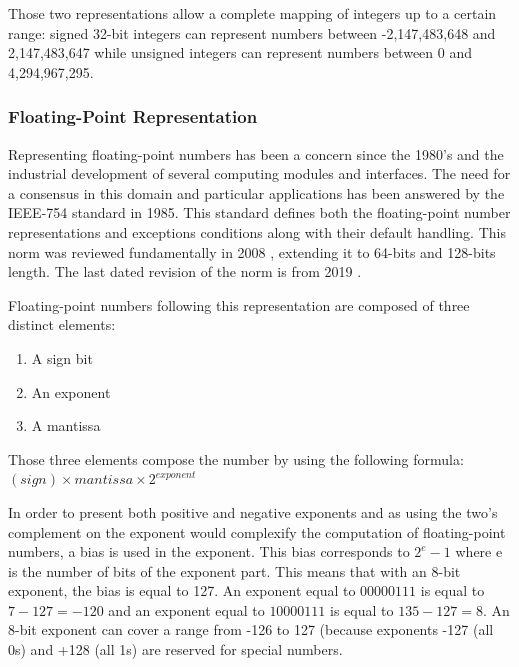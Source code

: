
Those two representations allow a complete mapping of integers up to a certain range: signed 32-bit integers can represent numbers between -2,147,483,648 and 2,147,483,647 while unsigned integers can represent numbers between 0 and 4,294,967,295.

\subsubsection{Floating-Point Representation}

Representing floating-point numbers has been a concern since the 1980's and the industrial development of several computing modules and interfaces. The need for a consensus in this domain and particular applications has been answered by the IEEE-754 standard \cite{Ieee754_1985} in 1985. This standard defines both the floating-point number representations and exceptions conditions along with their default handling. This norm was reviewed fundamentally in 2008 \cite{Ieee754_2008}, extending it to 64-bits and 128-bits length. The last dated revision of the norm is from 2019 \cite{Ieee754_2019}.

Floating-point numbers following this representation are composed of three distinct elements:
\begin{enumerate}
  \item A sign bit
  \item An exponent
  \item A mantissa
\end{enumerate}

Those three elements compose the number by using the following formula: $(\mathit{sign}) \times \mathit{mantissa} \times 2^{\mathit{exponent}}$

In order to present both positive and negative exponents and as using the two's complement on the exponent would complexify the computation of floating-point numbers, a bias is used in the exponent. This bias corresponds to $2^e - 1$ where e is the number of bits of the exponent part. This means that with an 8-bit exponent, the bias is equal to 127. An exponent equal to $00000111$ is equal to $7 - 127 = -120$ and an exponent equal to $10000111$ is equal to $135 - 127 = 8$. An 8-bit exponent can cover a range from -126 to 127 (because exponents -127 (all 0s) and +128 (all 1s) are reserved for special numbers.

